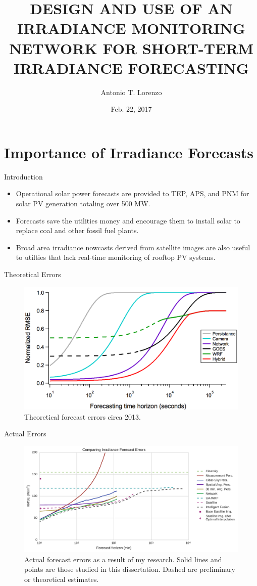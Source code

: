 \documentclass[aspectratio=169]{beamer}
\title[Dissertation Proposal]{DESIGN AND USE OF AN IRRADIANCE
  MONITORING NETWORK FOR SHORT-TERM IRRADIANCE FORECASTING}
\author[Lorenzo]{Antonio T. Lorenzo}
\institute{University of Arizona}
\date{Feb. 22, 2017}
\begin{document}
\begin{frame}
  \titlepage
\end{frame}


\section{Importance of Irradiance Forecasts}
\label{sec:intro}

\begin{frame}{Introduction}
\begin{itemize}
\item Operational solar power forecasts are provided to TEP, APS, and
  PNM for solar PV generation totaling over 500 MW.
\item Forecasts save the utilities money and encourage them
  to install solar to replace coal and other fossil fuel plants.
\item Broad area irradiance nowcasts derived from satellite images are
  also useful to utilties that lack real-time monitoring of rooftop PV systems.
\end{itemize}
\end{frame}

\begin{frame}{Theoretical Errors}
\begin{figure}[h]
  \includegraphics[height=.7\textheight]{figs/original_bullshit.png}
  \caption{Theoretical forecast errors circa 2013.}
\end{figure}
\end{frame}

\begin{frame}{Actual Errors}
\begin{figure}[h]
  \includegraphics[width=.7\textwidth]{../dissertation/figs/timehorizon.pdf}
  \caption{Actual forecast errors as a result of my research. Solid lines
    and points are those studied in this dissertation. Dashed are preliminary
    or theoretical estimates.}
\end{figure}
\end{frame}
\end{document}
